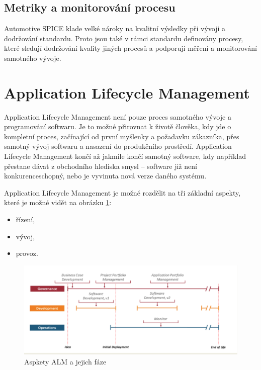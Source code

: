 \documentclass[czech,master,public,dept460,male,cpdeclaration,oneside]{diploma}
\begin{document}
\subsection{Metriky a monitorování procesu}
Automotive SPICE klade velké nároky na kvalitní výsledky při vývoji a dodržování standardu. Proto jsou také v rámci standardu definovány procesy, které sledují dodržování kvality jiných procesů a podporují měření a monitorování samotného vývoje.



\section{Application Lifecycle Management}
\label{sec:alm}
Application Lifecycle Management není pouze proces samotného vývoje a programování softwaru. Je to možné přirovnat k životě člověka, kdy jde o kompletní proces, začínající od první myšlenky a požadavku zákazníka, přes samotný vývoj softwaru a nasazení do produkčního prostředí. Application Lifecycle Management končí až jakmile končí samotný software, kdy například přestane dávat z obchodního hlediska smysl -- software již není konkurenceschopný, nebo je vyvinuta nová verze daného systému. \cite{alm_chappell}

Application Lifecycle Management je možné rozdělit na tři základní aspekty, které je možné vidět na obrázku \ref{fig:alm}:

\begin{itemize}
  \item řízení,
  \item vývoj,
  \item provoz.
\end{itemize}

\begin{figure}[!ht]
    \centering
    \includegraphics[width=1\textwidth]{Diplomka/Figures/alm.png}
    \caption{Aspkety ALM a jejich fáze \cite{alm_chappell}}
    \label{fig:alm}
\end{figure}
\end{document}
